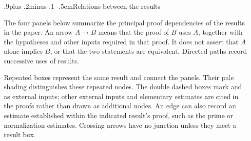\documentclass[twoside]{aomart}
\makeatletter
\theoremstyle{paperplain}
\theoremstyle{paperdefinition}
\renewcommand\subsection{\@startsection{subsection}{2}{\z@}
  {.9\baselineskip plus .2\baselineskip minus .1\baselineskip}
  {-.5em}{\normalfont\bfseries}}
\numberwithin{equation}{section}
\makeatother
\begin{document}
\subsection{Relations between the results}
\label{framework:result-graph}

The four panels below summarize the principal proof dependencies of the
results in the paper. An arrow \(A\to B\) means that the proof of \(B\)
uses \(A\), together with the hypotheses and other inputs required in
that proof. It does not assert that \(A\) alone implies \(B\), or that
the two statements are equivalent. Directed paths record successive
uses of results.

Repeated boxes represent the same result and connect the panels.
Their pale shading distinguishes these repeated nodes. The double
dashed boxes mark  and  as external inputs; other external inputs
and elementary estimates are cited in the proofs rather than drawn
as additional nodes. An edge can also record an estimate established
within the indicated result's proof, such as the prime or
normalization estimates. Crossing arrows have no junction unless
they meet a result box.

\begingroup
\raggedbottom
\newcommand{\resultgraphbox}[2]{\Cref{#1}}
\end{document}

